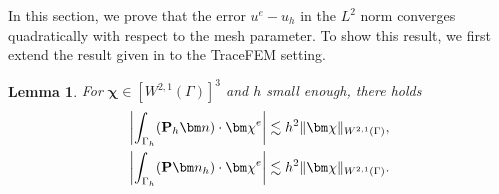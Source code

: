 \documentclass[10pt, a4paper]{amsart}
\newcommand{\bn}{{\bm n}}
\newcommand{\bchi}{{\bm \chi}}
\newtheorem{lemma}[theorem]{Lemma}
\theoremstyle{definition}
\theoremstyle{remark}
\theoremstyle{example}
\numberwithin{equation}{section}
\begin{document}
In this section, we prove
that the error $u^e-u_h$ 
in the $L^2$ norm converges quadratically
with respect to the mesh parameter.
To show this result, we first
extend the result given in \cite[Lemma 3.2]{LarssonLarson17}
to the TraceFEM setting.
\begin{lemma}\label{lem:Phbn}%
For $\bchi \in [W^{2, 1}(\Gamma)]^3$ and $h$ small enough, there holds
\begin{align}
\left|\int_{\Gamma_h}({\bf P}_h\bn) \cdot \bchi^e\right|
& \lesssim h^2\|\bchi\|_{W^{2, 1}(\Gamma)}, \label{250728-2} \\
\left|\int_{\Gamma_h}({\bf P}\bn_h) \cdot \bchi^e\right|
& \lesssim h^2\|\bchi\|_{W^{2, 1}(\Gamma)}. \label{250909-2}
\end{align}
\end{lemma}
\end{document}
